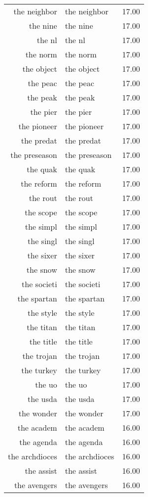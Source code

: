 \begin{table}[ht]
\begin{tabular}{rlr}
  the neighbor & the neighbor & 17.00 \\ 
  the nine & the nine & 17.00 \\ 
  the nl & the nl & 17.00 \\ 
  the norm & the norm & 17.00 \\ 
  the object & the object & 17.00 \\ 
  the peac & the peac & 17.00 \\ 
  the peak & the peak & 17.00 \\ 
  the pier & the pier & 17.00 \\ 
  the pioneer & the pioneer & 17.00 \\ 
  the predat & the predat & 17.00 \\ 
  the preseason & the preseason & 17.00 \\ 
  the quak & the quak & 17.00 \\ 
  the reform & the reform & 17.00 \\ 
  the rout & the rout & 17.00 \\ 
  the scope & the scope & 17.00 \\ 
  the simpl & the simpl & 17.00 \\ 
  the singl & the singl & 17.00 \\ 
  the sixer & the sixer & 17.00 \\ 
  the snow & the snow & 17.00 \\ 
  the societi & the societi & 17.00 \\ 
  the spartan & the spartan & 17.00 \\ 
  the style & the style & 17.00 \\ 
  the titan & the titan & 17.00 \\ 
  the title & the title & 17.00 \\ 
  the trojan & the trojan & 17.00 \\ 
  the turkey & the turkey & 17.00 \\ 
  the uo & the uo & 17.00 \\ 
  the usda & the usda & 17.00 \\ 
  the wonder & the wonder & 17.00 \\ 
  the academ & the academ & 16.00 \\ 
  the agenda & the agenda & 16.00 \\ 
  the archdioces & the archdioces & 16.00 \\ 
  the assist & the assist & 16.00 \\ 
  the avengers & the avengers & 16.00 \\ 

\end{tabular}
\end{table}
